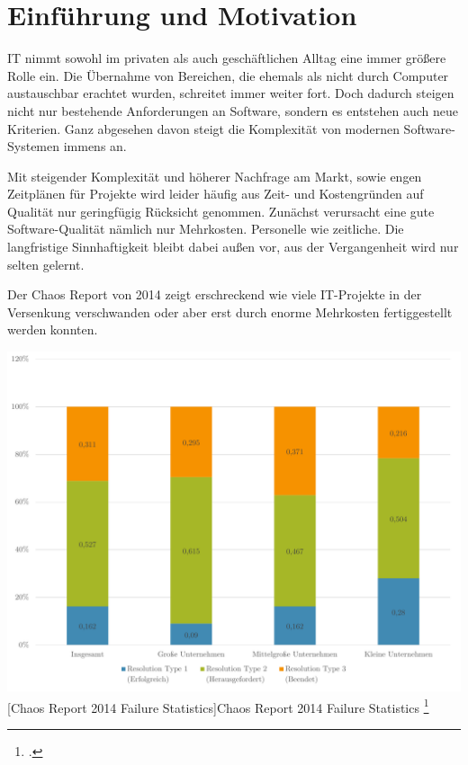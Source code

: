 \documentclass[12pt,a4paper,bibliography=totocnumbered,listof=totocnumbered]{scrartcl}
\begin{document}
\onehalfspacing
\renewcommand{\thesection}{\arabic{section}}
\renewcommand{\theHsection}{\arabic{section}}
\setcounter{section}{0}
\setcounter{page}{1}

\section{Einführung und Motivation}

IT nimmt sowohl im privaten als auch geschäftlichen Alltag eine immer größere Rolle ein. Die Übernahme von Bereichen, die ehemals als nicht durch Computer austauschbar erachtet wurden, schreitet immer weiter fort. Doch dadurch steigen nicht nur bestehende Anforderungen an Software, sondern es entstehen auch neue Kriterien. Ganz abgesehen davon steigt die Komplexität von modernen Software-Systemen immens an.

Mit steigender Komplexität und höherer Nachfrage am Markt, sowie engen Zeitplänen für Projekte wird leider häufig aus Zeit- und Kostengründen auf Qualität nur geringfügig Rücksicht genommen. Zunächst verursacht eine gute Software-Qualität nämlich nur Mehrkosten. Personelle wie zeitliche. Die langfristige Sinnhaftigkeit bleibt dabei außen vor, aus der Vergangenheit wird nur selten gelernt.

Der Chaos Report von 2014 zeigt erschreckend wie viele IT-Projekte in der Versenkung verschwanden oder aber erst durch enorme Mehrkosten fertiggestellt werden konnten.

\vspace{1em}
\begin{minipage}{\linewidth}
	\centering
	\includegraphics[width=0.9\linewidth]{images/dg_failed-projects.pdf}
	[Chaos Report 2014 Failure Statistics]{Chaos Report 2014 Failure Statistics \footcite[]{chaosreport}}
	\label{fig:dg_failed-projects}
\end{minipage}
\end{document}
